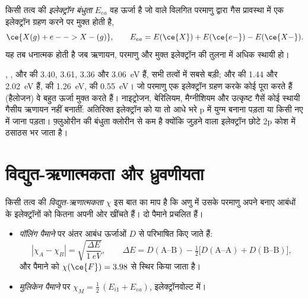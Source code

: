 \begin{definition}[इलेक्ट्रॉन बंधुता]\label{def:b1:periodicity:electron-affinity}
किसी तत्व की \emph{इलेक्ट्रॉन बंधुता} $E_{ea}$
वह ऊर्जा है जो  वाले विलगित परमाणु द्वारा गैस प्रावस्था में एक इलेक्ट्रॉन
ग्रहण करने पर मुक्त होती है,
\[
  \ce{X(g) + e- -> X-(g)}, \qquad E_{ea} = E(\ce{X}) + E(\ce{e-}) - E(\ce{X-}) .
\]
यह तब धनात्मक होती है जब ऋणायन, परमाणु और मुक्त इलेक्ट्रॉन की तुलना में अधिक
स्थायी हो।
\end{definition}

\begin{example}[हैलोजन और उनके पड़ोसी]\label{ex:b1:periodicity:ea}
, ,  और  की  3.40,
3.61, 3.36 और \qty{3.06}{eV} हैं, सभी तत्वों में सबसे बड़ी;
 और  की 1.44 और \qty{2.02}{eV} हैं,  की \qty{1.26}{eV},
 की \qty{0.55}{eV}। जो परमाणु एक इलेक्ट्रॉन ग्रहण करके कोई  पूरा करते हैं
(हैलोजन) वे बहुत ऊर्जा मुक्त करते हैं। नाइट्रोजन, बेरिलियम,
मैग्नीशियम और उत्कृष्ट गैसें कोई स्थायी गैसीय ऋणायन नहीं बनातीं: अतिरिक्त
इलेक्ट्रॉन को या तो आधे भरे p  में युग्म बनाना पड़ता या किसी नए
 में जाना पड़ता। फ़्लुओरीन की बंधुता क्लोरीन से कम है क्योंकि
जुड़ने वाला इलेक्ट्रॉन छोटे 2p कोश में ठसाठस भर जाता है।
\end{example}

\section{विद्युत-ऋणात्मकता और ध्रुवणीयता}

\begin{definition}[विद्युत-ऋणात्मकता]\label{def:b1:periodicity:electronegativity}
किसी तत्व की \emph{विद्युत-ऋणात्मकता} $\chi$
इस बात का माप है कि अणु में उसके परमाणु अपने बनाए आबंधों के इलेक्ट्रॉनों को
कितना अपनी ओर खींचते हैं। दो पैमाने प्रचलित हैं।
\begin{itemize}
  \item \emph{पॉलिंग पैमाने} पर अंतर
        आबंध ऊर्जाओं $D$ से परिभाषित किए जाते हैं:
        \[
          |\chi_A - \chi_B| = \sqrt{\frac{\Delta E}{\qty{1}{eV}}}, \qquad
          \Delta E = D(\text{A--B}) - \tfrac12\big[D(\text{A--A}) +
          D(\text{B--B})\big],
        \]
        और पैमाने को $\chi(\ce{F}) = 3.98$ से स्थिर किया जाता है।
  \item \emph{मुलिकेन पैमाने} पर
        $\chi_M = \tfrac12\,(E_{i1} + E_{ea})$, इलेक्ट्रॉनवोल्ट में।
\end{itemize}
\end{definition}

